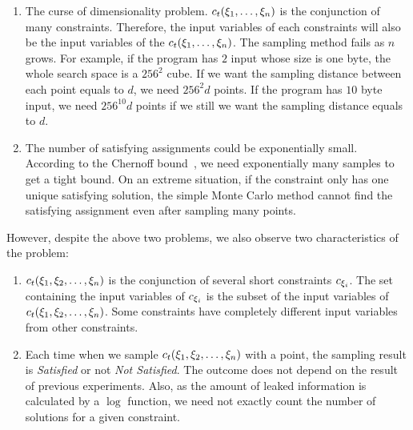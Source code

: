 \begin{enumerate}
    \item The curse of dimensionality problem. $c_t({{\xi}_{1}},\ldots,{{\xi}_{n}})$ is
          the conjunction of many constraints. Therefore, the input variables
          of each constraints will also be the input variables of the
          $c_t({{\xi}_{1}},\ldots,{{\xi}_{n}})$. The sampling method fails
          as $n$ grows.
          For example, if the program has $2$ input whose size is
          one byte, the whole search space is a $256^2$ cube. If we want
          the sampling distance between each point equals to $d$, we need
          $256^2d$ points. If the program has $10$ byte input, we need
          $256^{10}d$ points if we still we want the sampling distance equals
          to $d$.

    \item The number of satisfying assignments could be exponentially small.
          According to the Chernoff bound~\cite{hoeffding1994probability}, we need exponentially many samples to
          get a tight bound.
          On an extreme situation, if the constraint only
          has one unique satisfying solution, the simple Monte Carlo method
          cannot find the satisfying assignment even after sampling many
          points.
\end{enumerate}

However, despite the above two problems, we also observe two characteristics of the
problem:
\begin{enumerate}
    \item $c_t({{\xi}_{1}},{{\xi}_{2}},\ldots,{{\xi}_{n}})$ is the conjunction of
          several short constraints $c_{{\xi}_{i}}$. The set containing the
          input variables of $c_{{\xi}_{i}}$ is the subset of the input
          variables of $c_t({{\xi}_{1}},{{\xi}_{2}},\ldots,{{\xi}_{n}})$. Some
          constraints have completely different input variables from other
          constraints.

    \item Each time when we sample $c_t({{\xi}_{1}},{{\xi}_{2}},\ldots,{{\xi}_{n}})$
          with a point, the sampling result is \emph{Satisfied} or not \emph{Not Satisfied}.
          The outcome does not depend on the result of
          previous experiments. Also, as the amount of leaked information is calculated
          by a $\log$ function, we need not exactly count the number of solutions for
          a given constraint.


\end{enumerate}

